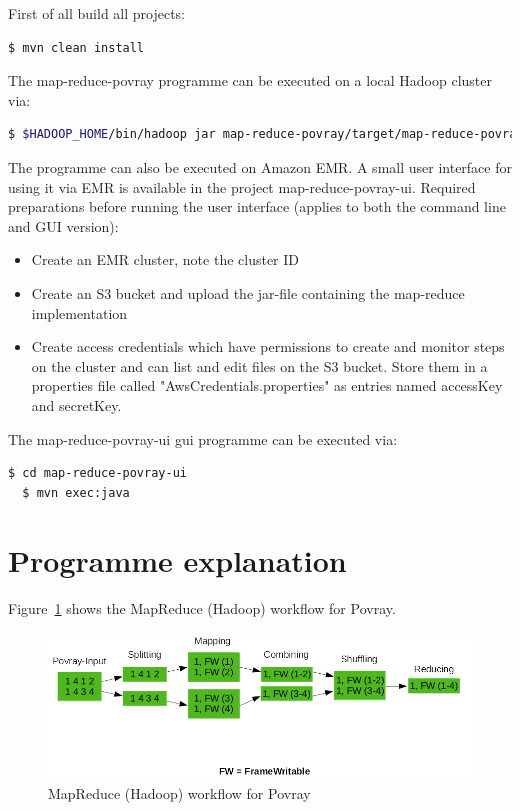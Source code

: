 \documentclass{article}
\begin{document}
First of all build all projects:

\begin{lstlisting}[language=bash, deletekeywords={cd}]
  $ mvn clean install
\end{lstlisting}

The map-reduce-povray programme can be executed on a local Hadoop cluster via:

\begin{lstlisting}[language=bash, deletekeywords={cd}]
  $ $HADOOP_HOME/bin/hadoop jar map-reduce-povray/target/map-reduce-povray-1.0.jar mapReducePovray.Povray <input-dir> <output-dir> <uri-of-pov-file>
\end{lstlisting}

The programme can also be executed on Amazon EMR. A small user interface for using it via EMR is available in the project map-reduce-povray-ui. Required preparations before running the user interface (applies to both the command line and GUI version):

\begin{itemize}
\item Create an EMR cluster, note the cluster ID
\item Create an S3 bucket and upload the jar-file containing the map-reduce implementation
\item Create access credentials which have permissions to create and monitor steps on the cluster and can list and edit files on the S3 bucket. Store them in a properties file called "AwsCredentials.properties" as entries named accessKey and secretKey.
\end{itemize}

The map-reduce-povray-ui gui programme can be executed via:

\begin{lstlisting}[language=bash, deletekeywords={cd}]
  $ cd map-reduce-povray-ui
  $ mvn exec:java
\end{lstlisting}

\section{Programme explanation}

Figure~\ref{fig:map-reduce-povray-workflow} shows the MapReduce (Hadoop) workflow for Povray.

\begin{figure}[htbp]
\begin{center}
\includegraphics[width=\textwidth]{map-reduce-povray-workflow.png}
\caption{MapReduce (Hadoop) workflow for Povray}
\label{fig:map-reduce-povray-workflow}
\end{center}
\end{figure}
\end{document}
